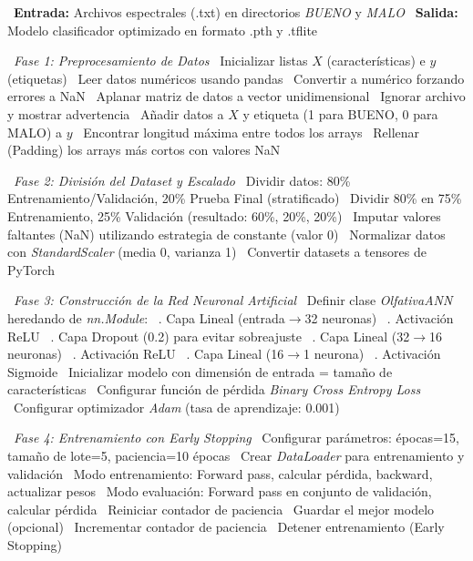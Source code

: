 \begin{algorithmic}[1]
\State~\textbf{Entrada:} Archivos espectrales (.txt) en directorios \textit{BUENO} y \textit{MALO}
\State~\textbf{Salida:} Modelo clasificador optimizado en formato \@.pth y \@.tflite

\State~\textit{Fase 1: Preprocesamiento de Datos}{}
\State~Inicializar listas $X$ (características) e $y$ (etiquetas)
%
    \State~Leer datos numéricos usando pandas
    \State~Convertir a numérico forzando errores a NaN
    \State~Aplanar matriz de datos a vector unidimensional
        \State~Ignorar archivo y mostrar advertencia
    \Else%
        \State~Añadir datos a $X$ y etiqueta (1 para BUENO, 0 para MALO) a $y$
    \EndIf%
\EndFor%
\State~Encontrar longitud máxima entre todos los arrays
\State~Rellenar (Padding) los arrays más cortos con valores NaN

\State~\textit{Fase 2: División del Dataset y Escalado}{}
\State~Dividir datos: 80\% Entrenamiento/Validación, 20\% Prueba Final (stratificado)
\State~Dividir 80\% en 75\% Entrenamiento, 25\% Validación (resultado: 60\%, 20\%, 20\%)
\State~Imputar valores faltantes (NaN) utilizando estrategia de constante (valor 0)
\State~Normalizar datos con \textit{StandardScaler} (media 0, varianza 1)
\State~Convertir datasets a tensores de PyTorch

\State~\textit{Fase 3: Construcción de la Red Neuronal Artificial}{}
\State~Definir clase \textit{OlfativaANN} heredando de \textit{nn.Module}:
\State~. Capa Lineal (entrada$\rightarrow$32 neuronas)
\State~. Activación ReLU
\State~. Capa Dropout (0.2) para evitar sobreajuste
\State~. Capa Lineal (32$\rightarrow$16 neuronas)
\State~. Activación ReLU
\State~. Capa Lineal (16$\rightarrow$1 neurona)
\State~. Activación Sigmoide
\State~Inicializar modelo con dimensión de entrada = tamaño de características
\State~Configurar función de pérdida \textit{Binary Cross Entropy Loss}
\State~Configurar optimizador \textit{Adam} (tasa de aprendizaje: 0.001)

\State~\textit{Fase 4: Entrenamiento con Early Stopping}{}
\State~Configurar parámetros: épocas=15, tamaño de lote=5, paciencia=10 épocas
\State~Crear \textit{DataLoader} para entrenamiento y validación
%
    \State~Modo entrenamiento: Forward pass, calcular pérdida, backward, actualizar pesos
    \State~Modo evaluación: Forward pass en conjunto de validación, calcular pérdida
        \State~Reiniciar contador de paciencia
        \State~Guardar el mejor modelo (opcional)
    \Else%
        \State~Incrementar contador de paciencia
            \State~Detener entrenamiento (Early Stopping)
        \EndIf%
    \EndIf%
\EndFor%


\end{algorithmic}
